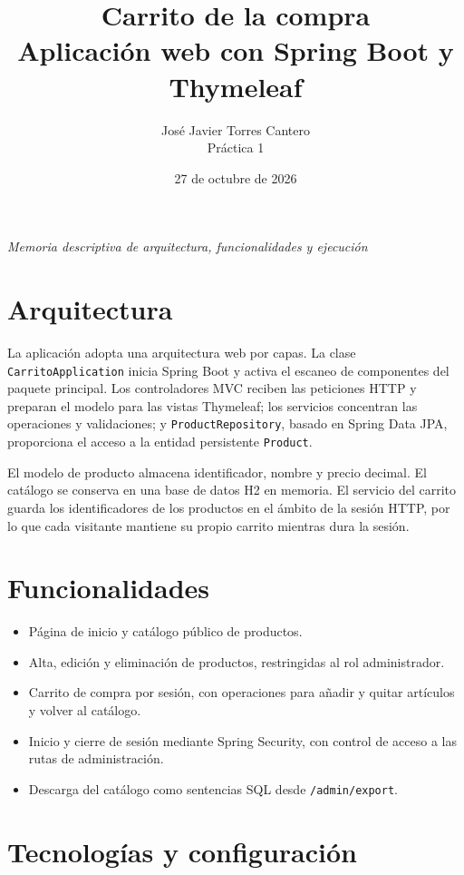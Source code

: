 \documentclass[9pt,a4paper]{extarticle}
\title{\vspace{-2.0em}\LARGE\bfseries\color{azulugr} Carrito de la compra\\[0.2em]
       \large Aplicación web con Spring Boot y Thymeleaf}
\author{José Javier Torres Cantero\\[0.25em]\normalsize Práctica 1}
\date{27 de octubre de 2026}
\begin{document}
\maketitle
\vspace{-2.0em}
\begin{center}
\footnotesize\textit{Memoria descriptiva de arquitectura, funcionalidades y ejecución}
\end{center}

\section{Arquitectura}

La aplicación adopta una arquitectura web por capas. La clase
\texttt{CarritoApplication} inicia Spring Boot y activa el escaneo de componentes
del paquete principal. Los controladores MVC reciben las peticiones HTTP y
preparan el modelo para las vistas Thymeleaf; los servicios concentran las
operaciones y validaciones; y \texttt{ProductRepository}, basado en Spring Data
JPA, proporciona el acceso a la entidad persistente \texttt{Product}.

El modelo de producto almacena identificador, nombre y precio decimal. El
catálogo se conserva en una base de datos H2 en memoria. El servicio del carrito
guarda los identificadores de los productos en el ámbito de la sesión HTTP, por
lo que cada visitante mantiene su propio carrito mientras dura la sesión.

\section{Funcionalidades}

\begin{itemize}
    \item Página de inicio y catálogo público de productos.
    \item Alta, edición y eliminación de productos, restringidas al rol
    administrador.
    \item Carrito de compra por sesión, con operaciones para añadir y quitar
    artículos y volver al catálogo.
    \item Inicio y cierre de sesión mediante Spring Security, con control de
    acceso a las rutas de administración.
    \item Descarga del catálogo como sentencias SQL desde
    \texttt{/admin/export}.
\end{itemize}

\section{Tecnologías y configuración}
\end{document}
